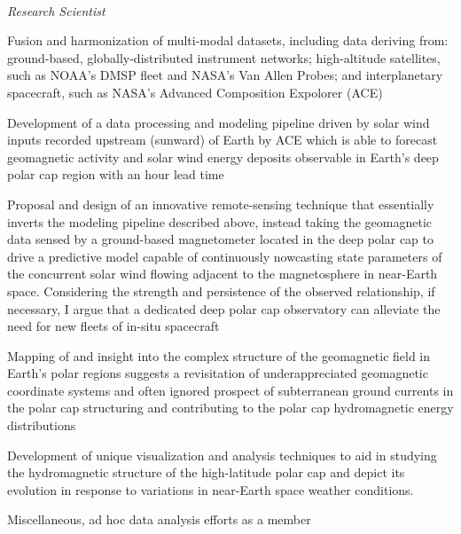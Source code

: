  \\  
\vspace{-0.8em}
\textit{Research Scientist} 
\begin{itemize*}
  \item Fusion and harmonization of multi-modal datasets, including 
    data deriving from: ground-based, globally-distributed instrument
    networks; high-altitude satellites, such as NOAA's DMSP fleet
    and NASA's Van Allen Probes; and interplanetary spacecraft, such as
    NASA's Advanced Composition Expolorer (ACE)
  \item Development of a data processing and modeling pipeline
     driven by solar wind inputs recorded upstream (sunward) of
     Earth by ACE which is able to forecast geomagnetic activity and
     solar wind energy deposits observable in Earth's deep polar cap region   
     with an hour lead time
  \item Proposal and design of an innovative remote-sensing technique
    that essentially inverts the modeling pipeline described above,
    instead taking the geomagnetic data sensed by a ground-based
    magnetometer located in the deep polar cap to drive
    a predictive model capable of continuously nowcasting state
    parameters of the concurrent solar wind flowing adjacent to the
    magnetosphere in near-Earth space.  Considering the strength and 
    persistence of the observed relationship, if necessary, I argue that
    a dedicated deep polar cap observatory can alleviate the need for
    new fleets of in-situ spacecraft 
  \item Mapping of and insight into the complex structure
    of the geomagnetic field in Earth's polar regions suggests 
    a revisitation of underappreciated geomagnetic coordinate systems
    and often ignored prospect of subterranean ground currents
    in the polar cap structuring and contributing to the polar
    cap hydromagnetic energy distributions
  \item Development of unique visualization and analysis techniques
    to aid in studying the hydromagnetic structure of the high-latitude polar
    cap and depict its evolution in response to variations in near-Earth 
    space weather conditions.
  \item  Miscellaneous, ad hoc data analysis efforts as a member

\end{itemize*}
